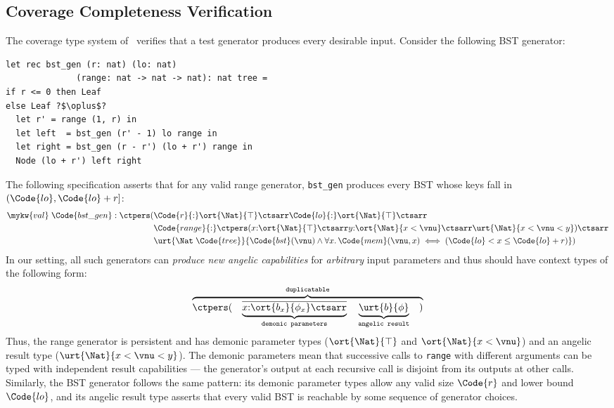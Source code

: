 \subsection{Coverage Completeness Verification}\label{subsec:coverage}
The coverage type system of~\citet{CoverageType} verifies that a
test generator produces every desirable input.
Consider the following BST generator:
\begin{verbatim}    
let rec bst_gen (r: nat) (lo: nat)
              (range: nat -> nat -> nat): nat tree =
if r <= 0 then Leaf
else Leaf ?$\oplus$?
  let r' = range (1, r) in
  let left  = bst_gen (r' - 1) lo range in
  let right = bst_gen (r - r') (lo + r') range in
  Node (lo + r') left right
\end{verbatim}
The following specification asserts that for any valid range generator,
\texttt{bst\_gen} produces every BST whose keys fall in $(\Code{lo},
\Code{lo}+r]$:
\begin{align*}
  \mykw{val}\;\Code{bst\_gen} : \ctpers(&
    \Code{r}{:}\ort{\Nat}{\top} \ctsarr \Code{lo}{:}\ort{\Nat}{\top} \ctsarr
  \\&
    \Code{range}{:}\ctpers (x{:}\ort{\Nat}{\top} \ctsarr
      y{:}\ort{\Nat}{x < \vnu} \ctsarr
      \urt{\Nat}{x < \vnu < y})
    \ctsarr
  \\&
    \urt{\Nat\;\Code{tree}}{\Code{bst}(\vnu) \land
      \forall x.\, \Code{mem}(\vnu, x) \iff
      (\Code{lo} < x \leq \Code{lo}+r)})
\end{align*}\noindent
In our setting, all such generators can \emph{produce new angelic capabilities} for \emph{arbitrary} input parameters and thus should have context types of the following form:
\begin{align*}
    \overbrace{\ctpers (\quad \underbrace{\overline{x{:}\ort{b_x}{\phi_x}\ctsarr}}_{\texttt{demonic parameters}} \quad \underbrace{\urt{b}{\phi}}_{\texttt{angelic result}} \quad )}^{\texttt{duplicatable}}
\end{align*}\noindent
Thus, the range generator is persistent and has demonic parameter types ($\ort{\Nat}{\top}$ and
$\ort{\Nat}{x < \vnu}$) and an angelic result type ($\urt{\Nat}{x <
  \vnu < y}$).  The demonic parameters mean that successive calls to
\texttt{range} with different arguments can be typed with
independent result capabilities — the generator's output at each
recursive call is disjoint from its outputs at other calls.  
Similarly, the BST generator follows the same pattern: its demonic parameter types allow any valid size $\Code{r}$ and lower bound $\Code{lo}$, and its angelic result type asserts that every valid BST is reachable by some sequence of generator choices.

